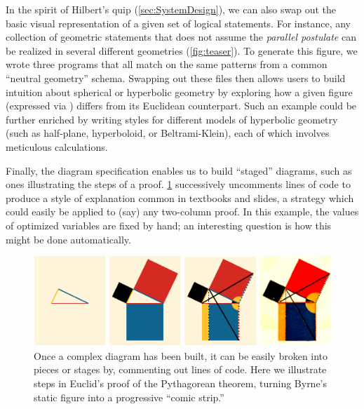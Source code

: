 In the spirit of Hilbert's quip (\cref{sec:SystemDesign}), we can also swap out the basic visual representation of a given set of logical statements.  For instance, any collection of geometric statements that does not assume the \emph{parallel postulate}  can be realized in several different geometries (\cref{fig:teaser}).  To generate this figure, we wrote three \Style{} programs that all match on the same patterns from a common ``neutral geometry'' \Domain{} schema.  Swapping out these \Style{} files then allows users to build intuition about spherical or hyperbolic geometry by exploring how a given figure (expressed via \Substance{}) differs from its Euclidean counterpart.  Such an example could be further enriched by writing styles for different models of hyperbolic geometry (such as half-plane, hyperboloid, or Beltrami-Klein), each of which involves meticulous calculations.  


Finally, the diagram specification enables us to build ``staged'' diagrams, such as ones illustrating the steps of a proof.  \cref{fig:byrne-stages} successively uncomments lines of \Substance{} code to produce a style of explanation common in textbooks and slides, a strategy which could easily be applied to (say) any two-column proof. In this example, the values of optimized variables are fixed by hand; an interesting question is how this might be done automatically.



\begin{figure}[t]
   \includegraphics[width=\columnwidth]{assets/penrose/byrne-stages.pdf}
   \caption{Once a complex diagram has been built, it can be easily broken into pieces or stages by, \eg commenting out lines of \Substance{} code.  Here we illustrate steps in Euclid's proof of the Pythagorean theorem, turning Byrne's static figure  into a progressive ``comic strip.''\label{fig:byrne-stages}}
 \end{figure}
 

